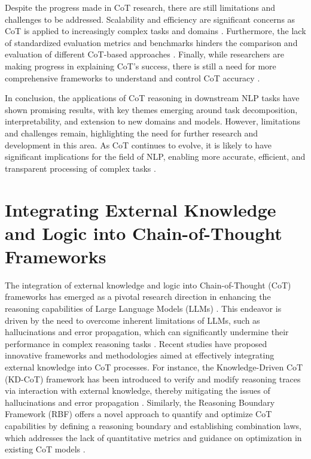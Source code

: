 \documentclass[conference]{IEEEtran}
\begin{document}
Despite the progress made in CoT research, there are still limitations and challenges to be addressed. Scalability and efficiency are significant concerns as CoT is applied to increasingly complex tasks and domains \cite{b13}. Furthermore, the lack of standardized evaluation metrics and benchmarks hinders the comparison and evaluation of different CoT-based approaches \cite{b14}. Finally, while researchers are making progress in explaining CoT's success, there is still a need for more comprehensive frameworks to understand and control CoT accuracy \cite{b15}.

In conclusion, the applications of CoT reasoning in downstream NLP tasks have shown promising results, with key themes emerging around task decomposition, interpretability, and extension to new domains and models. However, limitations and challenges remain, highlighting the need for further research and development in this area. As CoT continues to evolve, it is likely to have significant implications for the field of NLP, enabling more accurate, efficient, and transparent processing of complex tasks \cite{b16}.

\section{Integrating External Knowledge and Logic into Chain-of-Thought Frameworks}
The integration of external knowledge and logic into Chain-of-Thought (CoT) frameworks has emerged as a pivotal research direction in enhancing the reasoning capabilities of Large Language Models (LLMs) \cite{b1}. This endeavor is driven by the need to overcome inherent limitations of LLMs, such as hallucinations and error propagation, which can significantly undermine their performance in complex reasoning tasks \cite{b2}. Recent studies have proposed innovative frameworks and methodologies aimed at effectively integrating external knowledge into CoT processes. For instance, the Knowledge-Driven CoT (KD-CoT) framework has been introduced to verify and modify reasoning traces via interaction with external knowledge, thereby mitigating the issues of hallucinations and error propagation \cite{b3}. Similarly, the Reasoning Boundary Framework (RBF) offers a novel approach to quantify and optimize CoT capabilities by defining a reasoning boundary and establishing combination laws, which addresses the lack of quantitative metrics and guidance on optimization in existing CoT models \cite{b4}.
\end{document}
